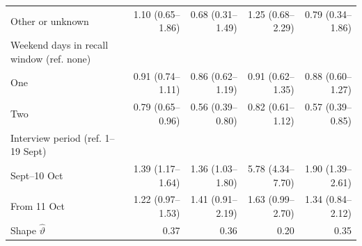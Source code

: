 \begin{tabular}{lrrrr}
\quad Other or unknown & 1.10 (0.65--1.86) & 0.68 (0.31--1.49) & 1.25 (0.68--2.29) & 0.79 (0.34--1.86) \\
\addlinespace
Weekend days in recall window (ref. none) &  &  &  &  \\
\quad One & 0.91 (0.74--1.11) & 0.86 (0.62--1.19) & 0.91 (0.62--1.35) & 0.88 (0.60--1.27) \\
\quad Two & 0.79 (0.65--0.96) & 0.56 (0.39--0.80) & 0.82 (0.61--1.12) & 0.57 (0.39--0.85) \\
\addlinespace
Interview period (ref. 1--19 Sept) &  &  &  &  \\
\quad 20 Sept--10 Oct & 1.39 (1.17--1.64) & 1.36 (1.03--1.80) & 5.78 (4.34--7.70) & 1.90 (1.39--2.61) \\
\quad From 11 Oct & 1.22 (0.97--1.53) & 1.41 (0.91--2.19) & 1.63 (0.99--2.70) & 1.34 (0.84--2.12) \\
\addlinespace
Shape $\hat\vartheta$ & 0.37 & 0.36 & 0.20 & 0.35 \\
\bottomrule
\end{tabular}
